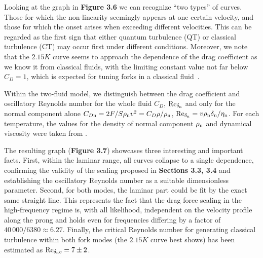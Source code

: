 Looking at the graph in {\sffamily\textbf{Figure 3.6}} we can recognize ``two types'' of curves. Those for which the non-linearity seemingly appears at one certain velocity, and those for which the onset arises when exceeding different velocities. This can be regarded as the first sign that either quantum turbulence (QT) or classical turbulence (CT) may occur first under different conditions. Moreover, we note that the $ 2.15 \unit{K}$ curve seems to approach the dependence of the drag coefficient as we know it from classical fluids, with the limiting constant value not far below $ C_D = 1 $, which is expected for tuning forks in a classical fluid~\cite{PraguePRB}.

Within the two-fluid model, we distinguish between the drag coefficient and oscillatory Reynolds number for the whole fluid $ C_{D}$, $ \text{Re}_{\delta_{\mathrm{n}}} $ and only for the normal component alone $ C_{D{\mathrm{n}}} = 2F/S\rho_{\mathrm{n}}v^2 = C_D \rho/\rho_{\mathrm{n}} $, $ \text{Re}_{\delta_{\mathrm{n}}} = v\rho_{\mathrm{n}}\delta_{\mathrm{n}}/\eta_{\mathrm{n}} $. For each temperature, the values for the density of normal component $ \rho_{\mathrm{n}} $ and dynamical viscosity were taken from \cite{donnelly}.

The resulting graph ({\sffamily\textbf{Figure 3.7}}) showcases three interesting and important facts. First, within the laminar range, all curves collapse to a single dependence, confirming the validity of the scaling proposed in {\sffamily\textbf{Sections 3.3, 3.4}} and establishing the oscillatory Reynolds number as a suitable dimensionless parameter. Second, for both modes, the laminar part could be fit by the exact same straight line. This represents the fact that the drag force scaling in the high-frequency regime is, with all likelihood, independent on the velocity profile along the prong and holds even for frequencies differing by a factor of $40\,000/6380\approx 6.27 $. Finally, the critical Reynolds number for generating classical turbulence within both fork modes (the $ 2.15\unit{K} $ curve best shows) has been estimated as $ \text{Re}_{\delta_{\mathrm{n}}c}=7\pm 2 $.




